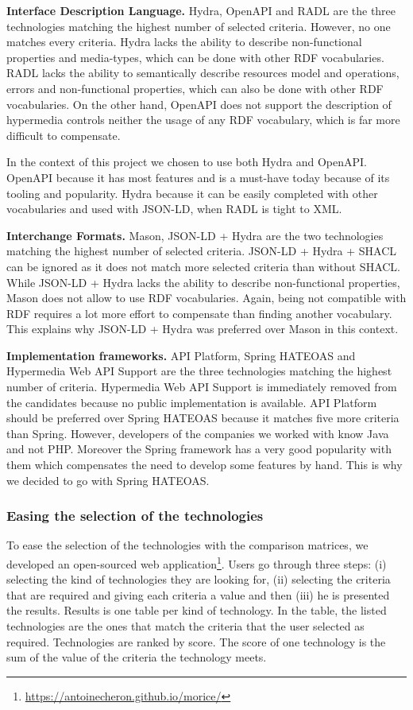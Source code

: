 \textbf{Interface Description Language.} Hydra, OpenAPI and RADL are the three technologies matching the highest number of selected criteria. However, no one matches every criteria. Hydra lacks the ability to describe non-functional properties and media-types, which can be done with other RDF vocabularies. RADL lacks the ability to semantically describe resources model and operations, errors and non-functional properties, which can also be done with other RDF vocabularies. On the other hand, OpenAPI does not support the description of hypermedia controls neither the usage of any RDF vocabulary, which is far more difficult to compensate. 

In the context of this project we chosen to use both Hydra and OpenAPI. OpenAPI because it has most features and is a must-have today because of its tooling and popularity. Hydra because it can be easily completed with other vocabularies and used with JSON-LD, when RADL is tight to XML.

\textbf{Interchange Formats.} Mason, JSON-LD + Hydra are the two technologies matching the highest number of selected criteria. JSON-LD + Hydra + SHACL can be ignored as it does not match more selected criteria than without SHACL. While JSON-LD + Hydra lacks the ability to describe non-functional properties, Mason does not allow to use RDF vocabularies. Again, being not compatible with RDF requires a lot more effort to compensate than finding another vocabulary. This explains why JSON-LD + Hydra was preferred over Mason in this context.

\textbf{Implementation frameworks.} API Platform, Spring HATEOAS and Hypermedia Web API Support \cite{salvadori2014framework} are the three technologies matching the highest number of criteria. Hypermedia Web API Support is immediately removed from the candidates because no public implementation is available. API Platform should be preferred over Spring HATEOAS because it matches five more criteria than Spring. However, developers of the companies we worked with know Java and not PHP. Moreover the Spring framework has a very good popularity with them which compensates the need to develop some features by hand. This is why we decided to go with Spring HATEOAS.

\subsubsection{Easing the selection of the technologies}

To ease the selection of the technologies with the comparison matrices, we developed an open-sourced web application\footnote{\url{https://antoinecheron.github.io/morice/}}. Users go through three steps: (i) selecting the kind of technologies they are looking for, (ii) selecting the criteria that are required and giving each criteria a value and then (iii) he is presented the results. Results is one table per kind of technology. In the table, the listed technologies are the ones that match the criteria that the user selected as required. Technologies are ranked by score. The score of one technology is the sum of the value of the criteria the technology meets.

